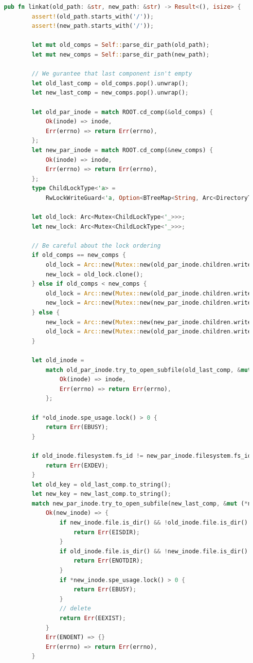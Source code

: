 \begin{lstlisting}[language=rust]
pub fn linkat(old_path: &str, new_path: &str) -> Result<(), isize> {
        assert!(old_path.starts_with('/'));
        assert!(new_path.starts_with('/'));

        let mut old_comps = Self::parse_dir_path(old_path);
        let mut new_comps = Self::parse_dir_path(new_path);

        // We gurantee that last component isn't empty
        let old_last_comp = old_comps.pop().unwrap();
        let new_last_comp = new_comps.pop().unwrap();

        let old_par_inode = match ROOT.cd_comp(&old_comps) {
            Ok(inode) => inode,
            Err(errno) => return Err(errno),
        };
        let new_par_inode = match ROOT.cd_comp(&new_comps) {
            Ok(inode) => inode,
            Err(errno) => return Err(errno),
        };
        type ChildLockType<'a> =
            RwLockWriteGuard<'a, Option<BTreeMap<String, Arc<DirectoryTreeNode>>>>;

        let old_lock: Arc<Mutex<ChildLockType<'_>>>;
        let new_lock: Arc<Mutex<ChildLockType<'_>>>;

        // Be careful about the lock ordering
        if old_comps == new_comps {
            old_lock = Arc::new(Mutex::new(old_par_inode.children.write()));
            new_lock = old_lock.clone();
        } else if old_comps < new_comps {
            old_lock = Arc::new(Mutex::new(old_par_inode.children.write()));
            new_lock = Arc::new(Mutex::new(new_par_inode.children.write()));
        } else {
            new_lock = Arc::new(Mutex::new(new_par_inode.children.write()));
            old_lock = Arc::new(Mutex::new(old_par_inode.children.write()));
        }

        let old_inode =
            match old_par_inode.try_to_open_subfile(old_last_comp, &mut (*old_lock.lock())) {
                Ok(inode) => inode,
                Err(errno) => return Err(errno),
            };

        if *old_inode.spe_usage.lock() > 0 {
            return Err(EBUSY);
        }

        if old_inode.filesystem.fs_id != new_par_inode.filesystem.fs_id {
            return Err(EXDEV);
        }
        let old_key = old_last_comp.to_string();
        let new_key = new_last_comp.to_string();
        match new_par_inode.try_to_open_subfile(new_last_comp, &mut (*new_lock.lock())) {
            Ok(new_inode) => {
                if new_inode.file.is_dir() && !old_inode.file.is_dir() {
                    return Err(EISDIR);
                }
                if old_inode.file.is_dir() && !new_inode.file.is_dir() {
                    return Err(ENOTDIR);
                }
                if *new_inode.spe_usage.lock() > 0 {
                    return Err(EBUSY);
                }
                // delete
                return Err(EEXIST);
            }
            Err(ENOENT) => {}
            Err(errno) => return Err(errno),
        }


\end{lstlisting}
